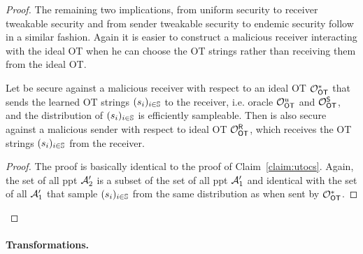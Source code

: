 \begin{proof}
The remaining two implications, from uniform security to receiver tweakable security and from sender tweakable security to endemic security follow in a similar fashion. Again it is easier to construct a malicious receiver interacting with the ideal OT when he can choose the OT strings rather than receiving them from the ideal OT.
\begin{claim}\label{claim:utocr}
Let \OT be secure against a malicious receiver with respect to an ideal OT $\mathcal{O}_{\mathsf{OT}}^*$ that sends the learned OT strings $(s_i)_{i\in\mathsf{\mathbb S}}$ to the receiver, i.e. oracle $\mathcal{O}_{\mathsf{OT}}^u$ and $\mathcal{O}_{\mathsf{OT}}^{\mathsf{S}}$, and the distribution of $(s_i)_{i\in\mathsf{\mathbb S}}$ is efficiently sampleable. Then \OT is also secure against a malicious sender with respect to ideal OT $\mathcal{O}_{\mathsf{OT}}^{\mathsf{R}}$, which receives the OT strings $(s_i)_{i\in\mathsf{\mathbb S}}$ from the receiver.
\end{claim}

\begin{proof}
The proof is basically identical to the proof of Claim~\ref{claim:utocs}. Again, the set of all ppt $\mathcal{A}_2'$ is a subset of the set of all ppt $\mathcal{A}_1'$ and identical with the set of all $\mathcal{A}_1'$ that sample  $(s_i)_{i\in\mathsf{\mathbb S}}$ from the same distribution as when sent by $\mathcal{O}_{\mathsf{OT}}^*$.
\end{proof}

\end{proof}








\paragraph{Transformations.} 


